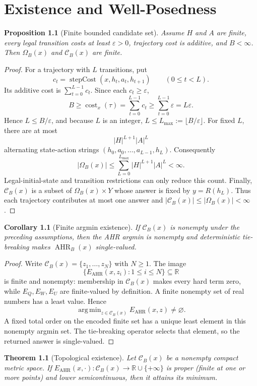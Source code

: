 \documentclass[11pt,oneside]{book}
\newtheorem{theorem}[definition]{Theorem}
\newtheorem{proposition}[definition]{Proposition}
\newtheorem{corollary}[definition]{Corollary}
\theoremstyle{remark}
\newcommand{\AHR}{\operatorname{AHR}}
\newcommand{\Om}{\Omega}
\newcommand{\cB}{\mathcal C_B}
\newcommand{\eps}{\varepsilon}
\DeclareMathOperator*{\argmin}{arg\,min}
\DeclareMathOperator{\cost}{cost}
\begin{document}
\chapter{Existence and Well-Posedness}

\begin{proposition}[Finite bounded candidate set]
Assume $H$ and $A$ are finite, every legal transition costs at least $\eps>0$, trajectory cost is additive, and $B<\infty$. Then $\Om_B(x)$ and $\cB(x)$ are finite.
\end{proposition}

\begin{proof}
For a trajectory with $L$ transitions, put
\[
c_t=\operatorname{stepCost}(x,h_t,a_t,h_{t+1})
\qquad(0\le t<L).
\]
Its additive cost is $\sum_{t=0}^{L-1}c_t$. Since each $c_t\ge\eps$,
\[
B\ge\cost_x(\tau)=\sum_{t=0}^{L-1}c_t
\ge\sum_{t=0}^{L-1}\eps=L\eps.
\]
Hence $L\le B/\eps$, and because $L$ is an integer,
$L\le L_{\max}:=\lfloor B/\eps\rfloor$. For fixed $L$, there are at most
\[
|H|^{L+1}|A|^L
\]
alternating state-action strings $(h_0,a_0,\ldots,a_{L-1},h_L)$.
Consequently
\[
|\Om_B(x)|
\le\sum_{L=0}^{L_{\max}}|H|^{L+1}|A|^L<\infty.
\]
Legal-initial-state and transition restrictions can only reduce this count.
Finally, $\cB(x)$ is a subset of $\Om_B(x)\times Y$ whose answer is fixed by
$y=R(h_L)$. Thus each trajectory contributes at most one answer and
$|\cB(x)|\le|\Om_B(x)|<\infty$.
\end{proof}

\begin{corollary}[Finite argmin existence]
If $\cB(x)$ is nonempty under the preceding assumptions, then the AHR argmin is nonempty and deterministic tie-breaking makes $\AHR_B(x)$ single-valued.
\end{corollary}

\begin{proof}
Write $\cB(x)=\{z_1,\ldots,z_N\}$ with $N\ge1$. The image
\[
\{E_{\mathrm{AHR}}(x,z_i):1\le i\le N\}
\subseteq\mathbb R
\]
is finite and nonempty: membership in $\cB(x)$ makes every hard term zero,
while $E_Q,E_W,E_U$ are finite-valued by definition. A finite nonempty set of
real numbers has a least value. Hence
\[
\argmin_{z\in\cB(x)}E_{\mathrm{AHR}}(x,z)\ne\varnothing.
\]
A fixed total order on the encoded finite set has a unique least element in
this nonempty argmin set. The tie-breaking operator selects that element, so
the returned answer is single-valued.
\end{proof}

\begin{theorem}[Topological existence]
Let $\cB(x)$ be a nonempty compact metric space. If
$E_{\mathrm{AHR}}(x,\cdot):\cB(x)\to\mathbb R\cup\{+\infty\}$ is proper
(finite at one or more points) and lower semicontinuous, then it attains its
minimum.
\end{theorem}
\end{document}
